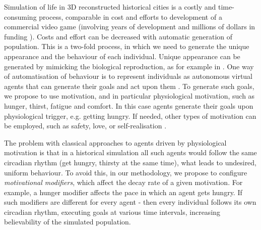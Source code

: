 \documentclass[graybox]{svmult}
\begin{document}

Simulation of life in 3D reconstructed historical cities is a costly and time-consuming process, comparable in cost and efforts to development of a commercial video game (involving years of development and millions of dollars in funding \cite{Crysis_development_cost}). Costs and effort can be decreased with automatic generation of population. This is a two-fold process, in which we need to generate the unique appearance and the behaviour of each individual. Unique appearance can be generated by mimicking the biological reproduction, as for example in \cite{trescak2012v}. One way of automatisation of behaviour is to represent individuals as autonomous virtual agents that can generate their goals and act upon them \cite{virtualAgents_planning}. To generate such goals, we propose to use motivation, and in particular physiological motivation, such as hunger, thirst, fatigue and comfort. In this case agents generate their goals upon physiological trigger, e.g. getting hungry. If needed, other types of motivation can be employed, such as safety, love, or self-realisation \cite{maslow1970} \cite{alderfer1969}. 

The problem with classical approaches to agents driven by physiological motivation is that in a historical simulation all such agents would follow the same circadian rhythm (get hungry, thirsty at the same time), what leads to undesired, uniform behaviour. To avoid this, in our methodology, we propose to configure \textit{motivational modifiers}, which affect the decay rate of a given motivation. For example, a hunger modifier affects the pace in which an agent gets hungry. If such modifiers are different for every agent - then every individual follows its own circadian rhythm, executing goals at various time intervals, increasing believability of the simulated population.
\end{document}
